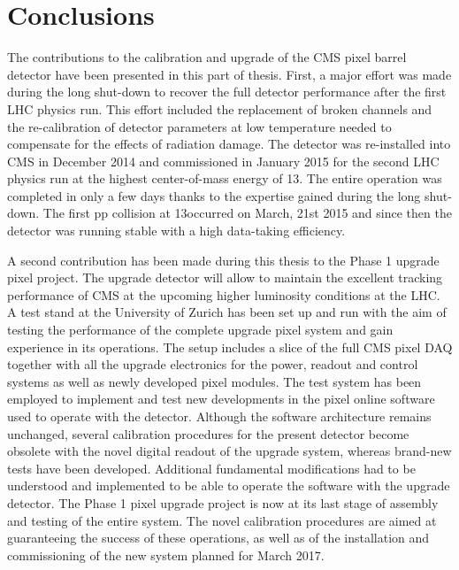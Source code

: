 \chapter{Conclusions}
\label{ch:summary2}

The contributions to the calibration and upgrade of the CMS pixel barrel detector have been presented in this part of thesis.
First, a major effort was made during the long shut-down to recover the full detector performance after the first LHC physics run.
This effort included the replacement of broken channels and the re-calibration of detector parameters at low temperature needed to compensate for the effects of radiation damage.
The detector was re-installed into CMS in December 2014 and commissioned in January 2015 for the second LHC physics run at the highest center-of-mass energy of 13\TeV.
The entire operation was completed in only a few days thanks to the expertise gained during the long shut-down.
The first pp collision at 13\TeV occurred on March, 21st 2015 and since then the detector
was running stable with a high data-taking efficiency.

A second contribution has been made during this thesis to the Phase 1 upgrade pixel project.
The upgrade detector will allow to maintain the excellent tracking performance of CMS at the upcoming higher luminosity conditions at the LHC.
A test stand at the University of Zurich has been set up and run with the aim of testing the performance of the complete upgrade pixel system and gain experience in its operations.
The setup includes a slice of the full CMS pixel DAQ together with all the upgrade electronics for the power, readout and control systems as well as newly developed pixel modules.
The test system has been employed to implement and test new developments in the pixel online software used to operate with the detector.
Although the software architecture remains unchanged, several calibration procedures for the present detector become obsolete with the novel digital readout of the upgrade system,
whereas brand-new tests have been developed. 
Additional fundamental modifications had to be understood and implemented to be able to operate the software with the upgrade detector.
The Phase 1 pixel upgrade project is now at its last stage of assembly and testing of the entire system.
The novel calibration procedures are aimed at guaranteeing the success of these operations, as well as of the installation and commissioning of the new system planned for March 2017.
